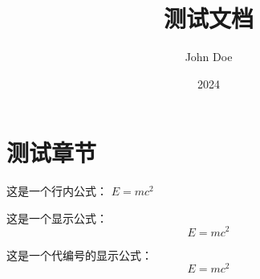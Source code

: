 \documentclass[a4paper,zihao=5]{kaobook}
\title{测试文档}
\author{John Doe}
\date{2024}
\begin{document}
\chapter{测试章节}

这是一个行内公式： $E=mc^2$

这是一个显示公式：
\[ E=mc^2 \]

这是一个代编号的显示公式：
\begin{equation}
    E=mc^2
\end{equation}
\end{document}
